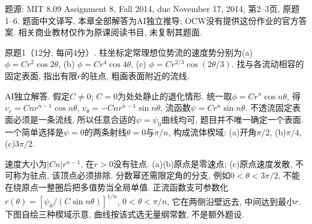 题源: MIT 8.09 Assignment 8, Fall 2014, due November 17, 2014, 第2--3页, 原题1--6. 题面中文译写, 本章全部解答为AI独立推导; OCW没有提供这份作业的官方答案. 相关商业教材仅作为原课阅读书目, 未复制其题面.

\begin{exercise}
原题1（12分, 每问4分）. 柱坐标定常理想位势流的速度势分别为(a) $\phi=Cr^2\cos2\theta$, (b) $\phi=Cr^4\cos4\theta$, (c) $\phi=Cr^{2/3}\cos(2\theta/3)$. 找与各流动相容的固定表面, 指出有限$r$的驻点, 粗画表面附近的流线.
\end{exercise}
\begin{solution}
AI独立解答. 假定$C\ne0$; $C=0$为处处静止的退化情形. 统一取$\phi=Cr^n\cos n\theta$, 得$v_r=Cnr^{n-1}\cos n\theta$, $v_\theta=-Cnr^{n-1}\sin n\theta$, 流函数$\psi=Cr^n\sin n\theta$. 不透流固定表面必须是一条流线, 所以任意合适的$\psi=\psi_0$曲线均可, 题目并不唯一确定一个表面. 一个简单选择是$\psi=0$的两条射线$\theta=0$与$\pi/n$, 构成流体楔域: (a)开角$\pi/2$, (b)$\pi/4$, (c)$3\pi/2$.

速度大小为$|Cn|r^{n-1}$, 在$r>0$没有驻点. (a)(b)原点是零速点; (c)原点速度发散, 不可称为驻点, 该顶点必须排除. 分数幂还需限定角的分支, 例如$0<\theta<3\pi/2$, 不能在绕原点一整圈后把多值势当全局单值. 正流函数支可参数化$r(\theta)=[\psi_0/(C\sin n\theta)]^{1/n}$, $0<\theta<\pi/n$, 它在两侧沿壁远去, 中间达到最小$r$. 下图自绘三种楔域示意, 曲线按该式选无量纲常数, 不是额外题设.
\end{solution}
\begin{center}
\end{center}

